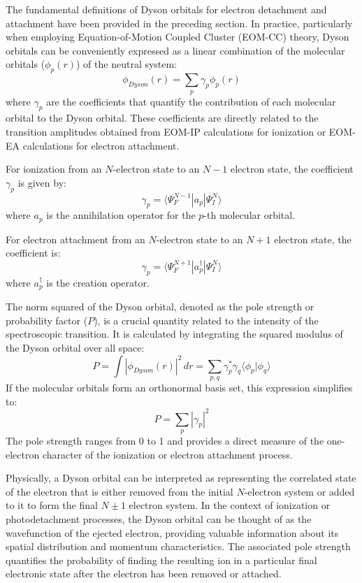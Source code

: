 The fundamental definitions of Dyson orbitals for electron detachment and attachment have been provided in the preceding section. In practice, particularly when employing Equation-of-Motion Coupled Cluster (EOM-CC) theory, Dyson orbitals can be conveniently expressed as a linear combination of the molecular orbitals ($\phi_p(r)$) of the neutral system:
\begin{equation}
    \phi_{Dyson}(r) = \sum_p \gamma_p \phi_p(r)
\end{equation}
where $\gamma_p$ are the coefficients that quantify the contribution of each molecular orbital to the Dyson orbital. These coefficients are directly related to the transition amplitudes obtained from EOM-IP calculations for ionization or EOM-EA calculations for electron attachment. 

For ionization from an $N$-electron state to an $N-1$ electron state, the coefficient $\gamma_p$ is given by:
\begin{equation}
    \gamma_p = \langle \Psi_F^{N-1} | a_p | \Psi_I^N \rangle
\end{equation}
where $a_p$ is the annihilation operator for the $p$-th molecular orbital. 

For electron attachment from an $N$-electron state to an $N+1$ electron state, the coefficient is:
\begin{equation}
    \gamma_p = \langle \Psi_F^{N+1} | a_p^\dagger | \Psi_I^N \rangle
\end{equation}
where $a_p^\dagger$ is the creation operator.

The norm squared of the Dyson orbital, denoted as the pole strength or probability factor ($P$), is a crucial quantity related to the intensity of the spectroscopic transition. It is calculated by integrating the squared modulus of the Dyson orbital over all space:
\begin{equation}
    P = \int |\phi_{Dyson}(r)|^2 \,dr = \sum_{p,q} \gamma_p^* \gamma_q \langle \phi_p | \phi_q \rangle
\end{equation}
If the molecular orbitals form an orthonormal basis set, this expression simplifies to:
\begin{equation}
    P = \sum_p |\gamma_p|^2
\end{equation}
The pole strength ranges from 0 to 1 and provides a direct measure of the one-electron character of the ionization or electron attachment process.

Physically, a Dyson orbital can be interpreted as representing the correlated state of the electron that is either removed from the initial $N$-electron system or added to it to form the final $N\pm1$ electron system. In the context of ionization or photodetachment processes, the Dyson orbital can be thought of as the wavefunction of the ejected electron, providing valuable information about its spatial distribution and momentum characteristics. The associated pole strength quantifies the probability of finding the resulting ion in a particular final electronic state after the electron has been removed or attached. 

